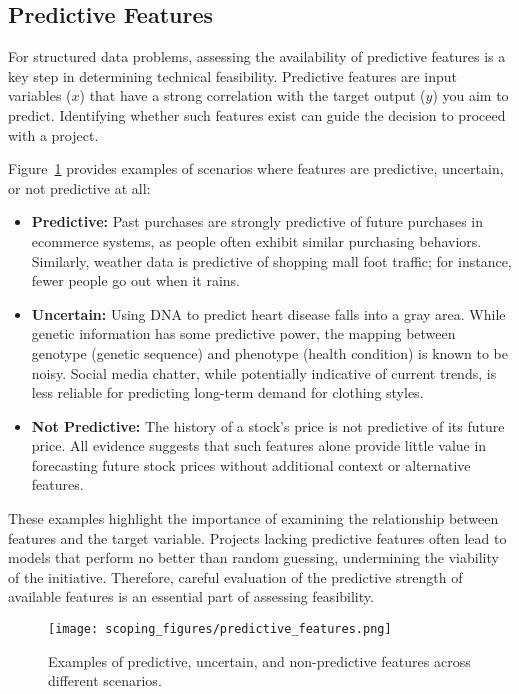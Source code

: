 \documentclass[12pt,openany]{book}
\begin{document}
\subsection{Predictive Features}

For structured data problems, assessing the availability of predictive features is a key step in determining technical feasibility. Predictive features are input variables (\(x\)) that have a strong correlation with the target output (\(y\)) you aim to predict. Identifying whether such features exist can guide the decision to proceed with a project.

Figure~\ref{fig:predictive_features} provides examples of scenarios where features are predictive, uncertain, or not predictive at all:
\begin{itemize}
    \item \textbf{Predictive:} Past purchases are strongly predictive of future purchases in ecommerce systems, as people often exhibit similar purchasing behaviors. Similarly, weather data is predictive of shopping mall foot traffic; for instance, fewer people go out when it rains.
    \item \textbf{Uncertain:} Using DNA to predict heart disease falls into a gray area. While genetic information has some predictive power, the mapping between genotype (genetic sequence) and phenotype (health condition) is known to be noisy. Social media chatter, while potentially indicative of current trends, is less reliable for predicting long-term demand for clothing styles.
    \item \textbf{Not Predictive:} The history of a stock's price is not predictive of its future price. All evidence suggests that such features alone provide little value in forecasting future stock prices without additional context or alternative features.
\end{itemize}

These examples highlight the importance of examining the relationship between features and the target variable. Projects lacking predictive features often lead to models that perform no better than random guessing, undermining the viability of the initiative. Therefore, careful evaluation of the predictive strength of available features is an essential part of assessing feasibility.

\begin{figure}[H]
    \centering
    \texttt{[image: scoping\_figures/predictive\_features.png]}
    \caption{Examples of predictive, uncertain, and non-predictive features across different scenarios.}
    \label{fig:predictive_features}
\end{figure}
\end{document}
